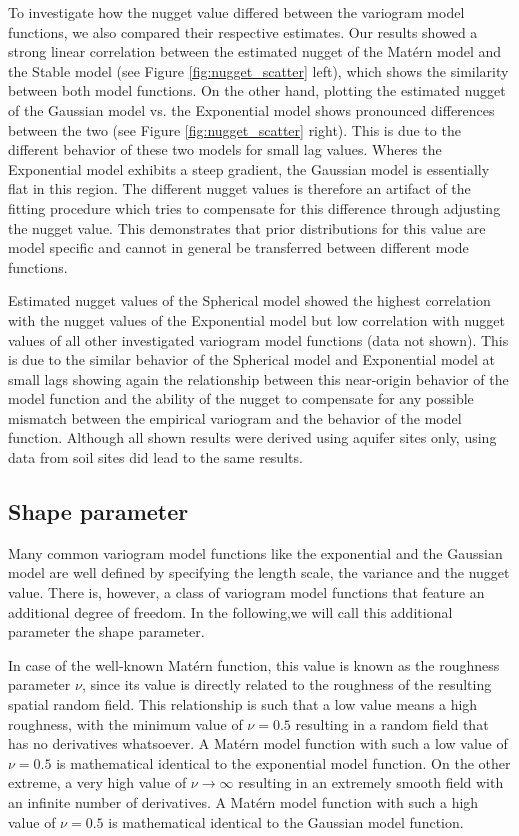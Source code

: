 \documentclass{article}
\begin{document}
To investigate how the nugget value differed between the variogram model functions, we also compared their respective estimates. Our results showed a strong linear correlation between the estimated nugget of the Mat{\'e}rn model and the Stable model (see Figure \ref{fig:nugget_scatter} left), which shows the similarity between both model functions. On the other hand, plotting the estimated nugget of the Gaussian model vs. the Exponential model shows pronounced differences between the two (see Figure \ref{fig:nugget_scatter} right). This is due to the different behavior of these two models for small lag values. Wheres the Exponential model exhibits a steep gradient, the Gaussian model is essentially flat in this region. The different nugget values is therefore an artifact of the fitting procedure which tries to compensate for this difference through adjusting the nugget value. This demonstrates that prior distributions for this value are model specific and cannot in general be transferred between different mode functions. 

Estimated nugget values of the Spherical model showed the highest correlation with the nugget values of the Exponential model but low correlation with nugget values of all other investigated variogram model functions (data not shown). This is due to the similar behavior of the Spherical model and Exponential model at small lags showing again the relationship between this near-origin behavior of the model function and the ability of the nugget to compensate for any possible mismatch between the empirical variogram and the behavior of the model function. Although all shown results were derived using aquifer sites only, using data from soil sites did lead to the same results.



\subsection{Shape parameter}

Many common variogram model functions like the exponential and the Gaussian model are well defined by specifying the length scale, the variance and the nugget value. There is, however, a class of variogram model functions that feature an additional degree of freedom. In the following,we will call this additional parameter the shape parameter. 

In case of the well-known Mat{\'e}rn function, this value is known as the roughness parameter $\nu$, since its value is directly related to the roughness of the resulting spatial random field. This relationship is such that a low value means a high roughness, with the minimum value of $\nu=0.5$ resulting in a random field that has no derivatives whatsoever. A Mat{\'e}rn model function with such a low value of $\nu=0.5$ is mathematical identical to the exponential model function. On the other extreme, a very high value of $\nu \rightarrow \infty$ resulting in an extremely smooth field with an infinite number of derivatives. A Mat{\'e}rn model function with such a high value of $\nu=0.5$ is mathematical identical to the Gaussian model function.
\end{document}
